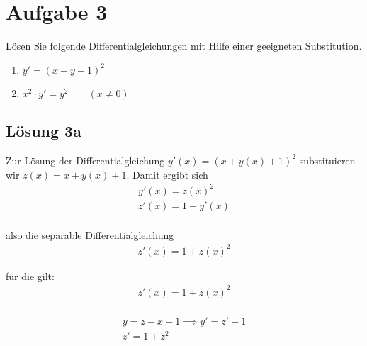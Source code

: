 \documentclass[main.tex]{subfiles}
\begin{document}
\section{Aufgabe 3}
Lösen Sie folgende Differentialgleichungen mit Hilfe einer geeigneten Substitution.
\begin{enumerate}
    \item $y' = (x + y + 1)^2$
    \item $x^2 \cdot y' = y^2 \qquad (x \neq 0)$
\end{enumerate}

\subsection{Lösung 3a}
Zur Lösung der Differentialgleichung $y'(x) = (x + y(x) + 1)^2$ substituieren wir $z(x) = x + y(x) +1$. Damit ergibt sich
\begin{align*}
	y'(x) = z(x)^2 \\
	z'(x) = 1 + y'(x) \\
\end{align*}

also die separable Differentialgleichung
\begin{align*}
	z'(x) = 1 + z(x)^2
\end{align*}

für die gilt:
\begin{align*}
	z'(x) = 1 + z(x)^2\\
\end{align*}



\begin{align*}
    y = z-x-1 \implies y' = z'-1\\
    z' = 1 + z^2 \\
\end{align*}
\end{document}

